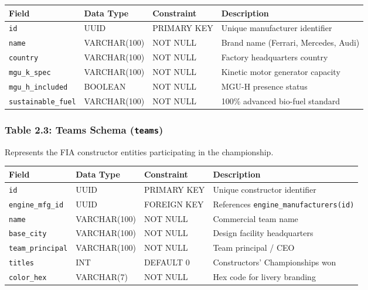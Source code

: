 \documentclass[12pt,a4paper]{report}
\begin{document}
\begin{table}[H]
\centering
\small
\begin{tabularx}{\textwidth}{l p{2.6cm} p{2.6cm} X}
\toprule
\rowcolor{gray!15}
\textbf{Field} & \textbf{Data Type} & \textbf{Constraint} & \textbf{Description} \\
\midrule
\texttt{id} & UUID & PRIMARY KEY & Unique manufacturer identifier \\
\texttt{name} & VARCHAR(100) & NOT NULL & Brand name (Ferrari, Mercedes, Audi) \\
\texttt{country} & VARCHAR(100) & NOT NULL & Factory headquarters country \\
\texttt{mgu\_k\_spec} & VARCHAR(100) & NOT NULL & Kinetic motor generator capacity \\
\texttt{mgu\_h\_included} & BOOLEAN & NOT NULL & MGU-H presence status \\
\texttt{sustainable\_fuel} & VARCHAR(100) & NOT NULL & 100\% advanced bio-fuel standard \\
\bottomrule
\end{tabularx}
\end{table}

\vspace{0.3cm}
\subsubsection*{Table 2.3: Teams Schema (\textnormal{\texttt{teams}})}
Represents the FIA constructor entities participating in the championship.

\begin{table}[H]
\centering
\small
\begin{tabularx}{\textwidth}{l p{2.6cm} p{2.6cm} X}
\toprule
\rowcolor{gray!15}
\textbf{Field} & \textbf{Data Type} & \textbf{Constraint} & \textbf{Description} \\
\midrule
\texttt{id} & UUID & PRIMARY KEY & Unique constructor identifier \\
\texttt{engine\_mfg\_id} & UUID & FOREIGN KEY & References \texttt{engine\_manufacturers(id)} \\
\texttt{name} & VARCHAR(100) & NOT NULL & Commercial team name \\
\texttt{base\_city} & VARCHAR(100) & NOT NULL & Design facility headquarters \\
\texttt{team\_principal} & VARCHAR(100) & NOT NULL & Team principal / CEO \\
\texttt{titles} & INT & DEFAULT 0 & Constructors' Championships won \\
\texttt{color\_hex} & VARCHAR(7) & NOT NULL & Hex code for livery branding \\
\bottomrule
\end{tabularx}
\end{table}
\end{document}
